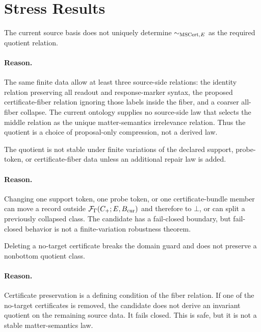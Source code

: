 \section{Stress Results}

\begin{proposition}
The current source basis does not uniquely determine \(\sim_{\mathrm{MSCert},E}\) as the
required quotient relation.
\end{proposition}

\paragraph{Reason.}
The same finite data allow at least three source-side relations: the identity
relation preserving all readout and response-marker syntax, the proposed
certificate-fiber relation ignoring those labels inside the fiber, and a
coarser all-fiber collapse. The current ontology supplies no source-side law
that selects the middle relation as the unique matter-semantics irrelevance
relation. Thus the quotient is a choice of proposal-only compression, not a
derived law.

\begin{proposition}
The quotient is not stable under finite variations of the declared support,
probe-token, or certificate-fiber data unless an additional repair law is
added.
\end{proposition}

\paragraph{Reason.}
Changing one support token, one probe token, or one certificate-bundle member
can move a record outside \(\mathcal F_{\Gamma}(C_+;E,B_{\mathrm{cur}})\) and therefore
to \(\bot\), or can split a previously collapsed class. The candidate has a
fail-closed boundary, but fail-closed behavior is not a finite-variation
robustness theorem.

\begin{proposition}
Deleting a no-target certificate breaks the domain guard and does not preserve
a nonbottom quotient class.
\end{proposition}

\paragraph{Reason.}
Certificate preservation is a defining condition of the fiber relation. If
one of the no-target certificates is removed, the candidate does not derive an
invariant quotient on the remaining source data. It fails closed. This is
safe, but it is not a stable matter-semantics law.

